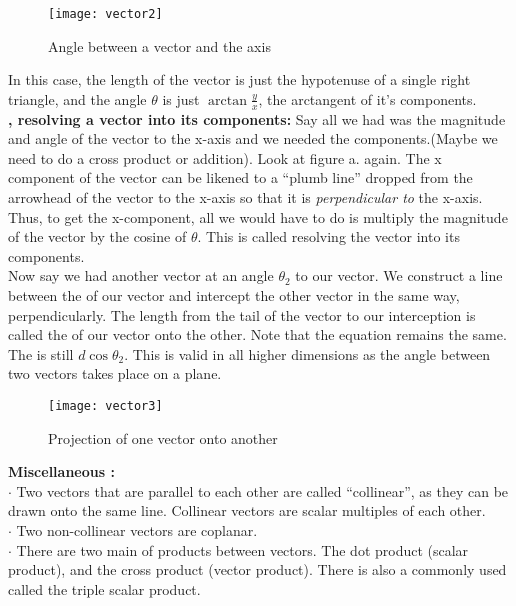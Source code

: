 \documentclass{article}
\begin{document}
\begin{figure}[htbp]
\begin{centering}
\texttt{[image: vector2]}
\caption{Angle between a vector and the axis}
\end{centering}
\end{figure}
In this case, the length of the vector is just the hypotenuse of a single right triangle, and the angle $\theta$ is just $\arctan \frac{y}{x}$, the arctangent of it's components.\\
\textbf{, resolving a vector into its components:} Say all we had was the magnitude and angle of the vector to the x-axis and we needed the components.(Maybe we need to do a cross product or addition). Look at figure a. again. The x component of the vector can be likened to a ``plumb line'' dropped from the arrowhead of the vector to the x-axis so that it is \emph{perpendicular to} the x-axis. Thus, to get the x-component, all we would have to do is multiply the magnitude of the vector by the cosine of $\theta$. This is called resolving the vector into its components.\\
Now say we had another vector at an angle $\theta_2$ to our vector. We construct a line between the  of our vector and intercept the other vector in the same way, perpendicularly. The length from the tail of the vector to our interception is called the \emph{} of our vector onto the other. Note that the equation remains the same. The  is still $d\cos\theta_2$. This  is valid in all higher dimensions as the angle between two vectors takes place on a plane.
\begin{figure}[htbp]
\begin{centering}
\texttt{[image: vector3]}
\caption{Projection of one vector onto another}
\end{centering}
\end{figure}
\textbf{Miscellaneous :}\\
$\cdot$ Two vectors that are parallel to each other are called ``collinear'', as they can be drawn onto the same line. Collinear vectors are scalar multiples of each other.\\
$\cdot$ Two non-collinear vectors are coplanar.\\
$\cdot$ There are two main  of products between vectors. The dot product (scalar product), and the cross product (vector product). There is also a commonly used  called the triple scalar product.
\end{document}

